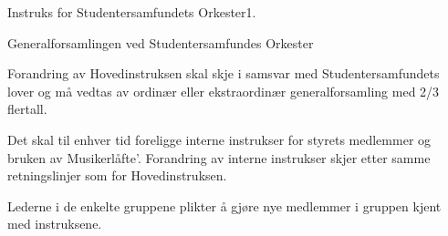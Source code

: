 \begin{instruks}{Instruks for Studentersamfundets Orkester}{1. }{ }
\begin{instruksledd}{Generalforsamlingen ved Studentersamfundes Orkester}
\begin{enumerate}
Forandring av Hovedinstruksen skal skje i samsvar med Studentersamfundets lover og må vedtas av
ordinær
eller ekstraordinær generalforsamling med 2/3 flertall.

Det skal til enhver tid foreligge interne instrukser for styrets medlemmer og bruken av
Musikerlåfte'.
Forandring av interne instrukser skjer etter samme retningslinjer som for Hovedinstruksen.

Lederne i de enkelte gruppene plikter å gjøre nye medlemmer i gruppen kjent med instruksene.

    \end{enumerate}
\end{instruksledd}

\end{instruks}



